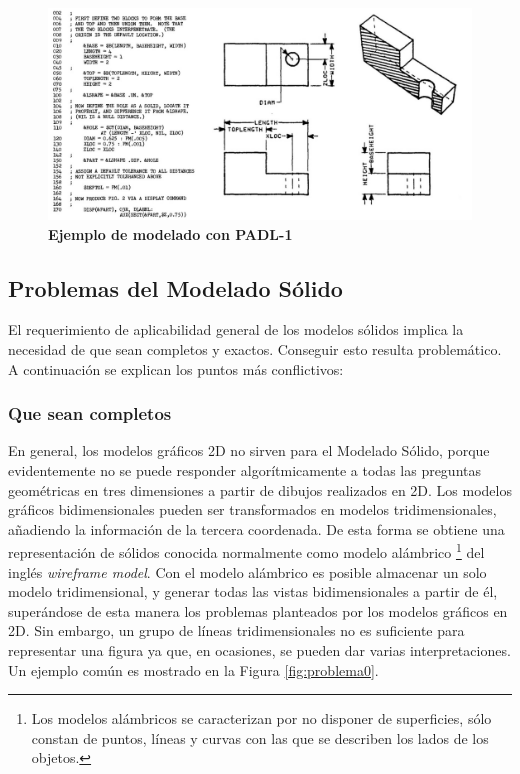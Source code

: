 \begin{figure}[h]
\includegraphics[width=16cm]{Img/GEO/geo-padl.jpg}
\centering
\caption{\textbf{\footnotesize{Ejemplo de modelado con PADL-1}}}
\end{figure}

\clearpage
\subsection{Problemas del Modelado Sólido }
\label{sectionproblema}

El requerimiento de aplicabilidad general de los modelos sólidos implica la necesidad de que sean completos y exactos. Conseguir esto resulta problemático.
A continuación se explican los puntos más conflictivos: 

\subsubsection{Que sean completos}

En general, los modelos gráficos 2D no sirven para el Modelado Sólido, porque evidentemente no se puede responder algorítmicamente a todas las preguntas geométricas en tres dimensiones a partir de dibujos realizados en 2D.
Los modelos gráficos bidimensionales pueden ser transformados en modelos tridimensionales, añadiendo la información de la tercera coordenada.
De esta forma se obtiene una representación de sólidos conocida normalmente como modelo alámbrico \footnote{Los modelos alámbricos se caracterizan por no disponer de superficies, sólo constan de puntos, líneas y curvas con las que se describen los lados de los objetos.} del inglés \textit{wireframe model}. Con el modelo alámbrico es posible almacenar un solo modelo tridimensional, y generar todas las vistas bidimensionales a partir de él, superándose de esta manera los problemas planteados por los modelos gráficos en 2D.
Sin embargo, un grupo de líneas tridimensionales no es suficiente para representar una figura ya que, en ocasiones, se pueden dar varias interpretaciones.
Un ejemplo común es mostrado en la Figura \ref{fig:problema0}.

